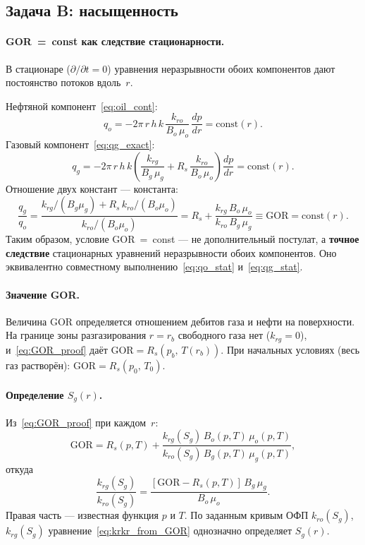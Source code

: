 ﻿\documentclass[12pt,a4paper]{article}
\begin{document}
\subsection{Задача B: насыщенность}\label{ssec:saturation}

\paragraph{GOR~=~const как следствие стационарности.}
В стационаре ($\partial/\partial t = 0$) уравнения
неразрывности обоих компонентов дают постоянство
потоков вдоль~$r$.

Нефтяной компонент~\eqref{eq:oil_cont}:
\begin{equation}\label{eq:qo_stat}
  q_o = -2\pi\,r\,h\,k\,\frac{k_{ro}}{B_o\,\mu_o}\,
  \frac{dp}{dr} = \mathrm{const}(r).
\end{equation}
Газовый компонент~\eqref{eq:qg_exact}:
\begin{equation}\label{eq:qg_stat}
  q_g = -2\pi\,r\,h\,k\left(\frac{k_{rg}}{B_g\,\mu_g}
  + R_s\,\frac{k_{ro}}{B_o\,\mu_o}\right)\frac{dp}{dr}
  = \mathrm{const}(r).
\end{equation}
Отношение двух констант --- константа:
\begin{equation}\label{eq:GOR_proof}
  \frac{q_g}{q_o}
  = \frac{k_{rg}/(B_g\mu_g) + R_s\,k_{ro}/(B_o\mu_o)}
         {k_{ro}/(B_o\mu_o)}
  = R_s + \frac{k_{rg}\,B_o\,\mu_o}{k_{ro}\,B_g\,\mu_g}
  \equiv \mathrm{GOR} = \mathrm{const}(r).
\end{equation}
Таким образом, условие GOR~=~const --- не дополнительный
постулат, а \textbf{точное следствие} стационарных
уравнений неразрывности обоих компонентов. Оно
эквивалентно совместному выполнению~\eqref{eq:qo_stat}
и~\eqref{eq:qg_stat}.

\paragraph{Значение GOR.}
Величина GOR определяется отношением дебитов газа
и нефти на поверхности. На границе зоны
разгазирования $r = r_b$ свободного газа нет
($k_{rg} = 0$), и~\eqref{eq:GOR_proof} даёт
$\mathrm{GOR} = R_s(p_b,\,T(r_b))$. При начальных
условиях (весь газ растворён):
$\mathrm{GOR} = R_s(p_0,\,T_0)$.

\paragraph{Определение $S_g(r)$.}
Из~\eqref{eq:GOR_proof} при каждом~$r$:
\begin{equation}\label{eq:GOR_const}
  \mathrm{GOR} = R_s(p,T)
  + \frac{k_{rg}(S_g)\,B_o(p,T)\,\mu_o(p,T)}
  {k_{ro}(S_g)\,B_g(p,T)\,\mu_g(p,T)},
\end{equation}
откуда
\begin{equation}\label{eq:krkr_from_GOR}
  \frac{k_{rg}(S_g)}{k_{ro}(S_g)}
  = \frac{[\mathrm{GOR} - R_s(p,T)]\,B_g\,\mu_g}
  {B_o\,\mu_o}.
\end{equation}
Правая часть --- известная функция $p$ и $T$.
По заданным кривым ОФП $k_{ro}(S_g)$, $k_{rg}(S_g)$
уравнение~\eqref{eq:krkr_from_GOR} однозначно
определяет $S_g(r)$.
\end{document}
